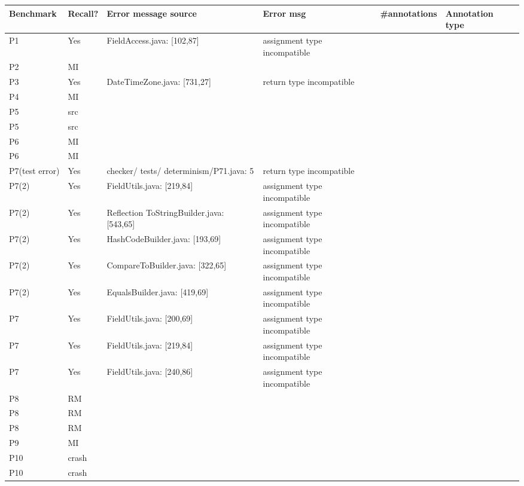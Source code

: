 \begin{table}[]
    \begin{tabular}{|p{1.5cm}|p{1cm}|p{3cm}|p{4cm}|p{2cm}|p{1.5cm}|}
        \hline
        Benchmark & Recall? & Error message source & Error msg & \#annotations & Annotation type  \\ \hline
        P1 & Yes & FieldAccess.java: [102,87] & assignment type incompatible &  &   \\
        P2 & MI &  &  &  &  \\
        P3 & Yes & DateTimeZone.java: [731,27] &  return type incompatible&  &  \\ 
        P4 & MI &  &  &  &  \\ 
        P5 & src &  &  &  &  \\ 
        P5 & src &  &  &  &  \\ 
        P6 & MI &  &  &  &  \\ 
        P6 & MI &  &  &  &  \\
        P7(test error) & Yes & checker/ tests/ determinism/P71.java: 5 & return type incompatible &  &  \\ 
        P7(2) & Yes & FieldUtils.java: [219,84] & assignment type incompatible &  &  \\
        P7(2) & Yes & Reflection ToStringBuilder.java: [543,65]  & assignment type incompatible &  &  \\
        P7(2) & Yes & HashCodeBuilder.java: [193,69]  & assignment type incompatible &  &  \\
        P7(2) & Yes & CompareToBuilder.java: [322,65] & assignment type incompatible &  &  \\
        P7(2) & Yes & EqualsBuilder.java: [419,69]  & assignment type incompatible &  &  \\
        P7 & Yes & FieldUtils.java: [200,69] & assignment type incompatible & &  \\
        P7 & Yes & FieldUtils.java: [219,84] & assignment type incompatible &  &  \\
        P7 & Yes & FieldUtils.java: [240,86] & assignment type incompatible &  &  \\
        P8 & RM &  &  &  &  \\
        P8 & RM &  &  &  &  \\
        P8 & RM &  &  &  &  \\
        P9 & MI &  &  &  &  \\
        P10 & crash &  &  &  &  \\
        P10 & crash &  &  &  &  \\

\end{tabular}
\end{table}

